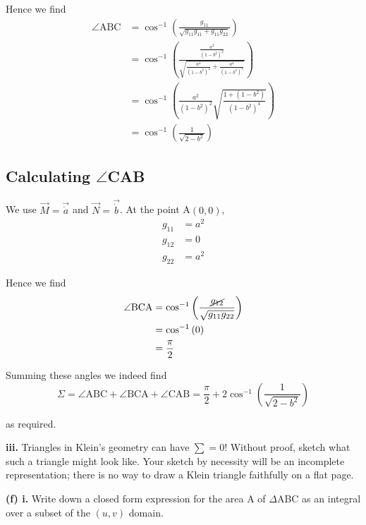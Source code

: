 \documentclass[a4paper]{article} %
\begin{document}
Hence we find
\begin{align}
\angle\text{ABC}&=\cos^{-1}\left(\frac{g_{11}}{\sqrt{g_{11}g_{11}+g_{11}g_{22}}}\right)\\
&=\cos^{-1}\left(\frac{\frac{a^2}{(1-b^2)^{2}}}{\sqrt{\frac{a^4}{(1-b^2)^4}+\frac{a^4}{(1-b^2)^3}}}
\right)\\
&=\cos^{-1}\left(\frac{a^2}{(1-b^2)^2}\sqrt{\frac{1+(1-b^2)}{(1-b^2)^4}}\right)\\
&=\cos^{-1}\left(\frac{1}{\sqrt{2-b^2}}\right)
\end{align}


\subsection*{Calculating $\angle$CAB}
We use $\vec{M}=\vec{\dot{a}}$ and $\vec{N}=\vec{\dot{b}}$. At the point A$(0,0)$,
\begin{align}
g_{11}&=a^2\\
g_{12}&=0\\
g_{22}&=a^2
\end{align}

Hence we find
\begin{align}
\angle\text{BCA}&=\cos^{-1}\left(\frac{\cancel{g_{12}}}{\sqrt{g_{11}g_{22}}}\right)\\
&=\cos^{-1}\left(0\right)\\
&=\frac{\pi}{2}
\end{align}

Summing these angles we indeed find
\begin{equation}
\Sigma = \angle\text{ABC}+\angle\text{BCA}+\angle\text{CAB}=\frac{\pi}{2}+2\cos^{-1}\left(\frac{1}{\sqrt{2-b^2}}\right)
\end{equation}

as required.


\begin{framed}
\textbf{iii.} Triangles in Klein's geometry can have $\sum=0$! Without proof, sketch what such a triangle might look like. Your sketch by necessity will be an incomplete representation; there is no way to draw a Klein triangle faithfully on a flat page.
\end{framed}


\begin{framed}
\textbf{(f) i.} Write down a closed form expression for the area A of $\Delta$ABC as an integral over a subset of the $(u,v)$ domain.
\end{framed}
\end{document}
